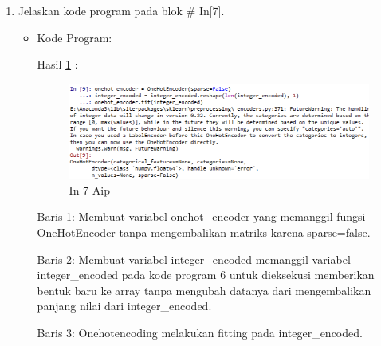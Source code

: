\begin{enumerate}
\item Jelaskan kode program pada blok \# In[7].
\begin{itemize}
\item Kode Program:

\par Hasil \ref{in7aip} :
\begin{figure}[!hbtp]
\centering
\includegraphics[scale=0.7]{figures/AIP/prak7.PNG}
\caption{In 7 Aip}
\label{in7aip}
\end{figure}
\par Baris 1: Membuat variabel onehot\_encoder yang memanggil fungsi OneHotEncoder tanpa mengembalikan matriks karena sparse=false.
\par Baris 2: Membuat variabel integer\_encoded memanggil variabel integer\_encoded pada kode program 6 untuk dieksekusi memberikan bentuk baru ke array tanpa mengubah datanya dari mengembalikan panjang nilai dari integer\_encoded.
\par Baris 3: Onehotencoding melakukan fitting pada integer\_encoded.
\end{itemize}
\par


\end{enumerate}
